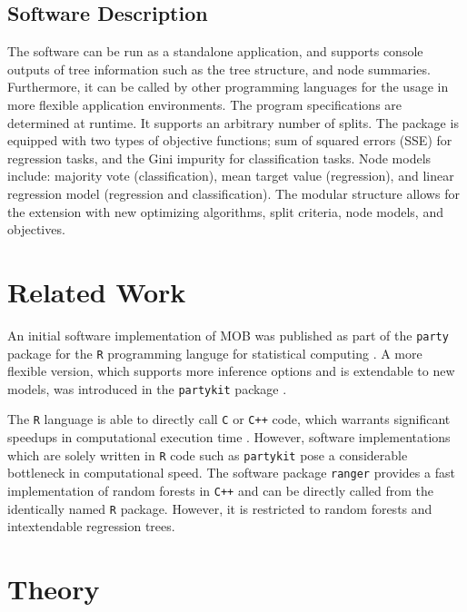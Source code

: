 \documentclass[a4paper, 11pt]{article}
\begin{document}
\subsection{Software Description}

The software can be run as a standalone application, and supports console outputs of tree information such as the tree structure, and node summaries. Furthermore, it can be called by other programming languages for the usage in more flexible application environments. The program specifications are determined at runtime. It supports an arbitrary number of splits.
The package is equipped with two types of objective functions; sum of squared errors (SSE) for regression tasks, and the Gini impurity for classification tasks. Node models include: majority vote (classification), mean target value (regression), and linear regression model (regression and classification).
The modular structure allows for the extension with 
new optimizing algorithms, split criteria, node models, and objectives. 

\section{Related Work}

An initial software implementation of MOB was published as part of the \texttt{party} package \cite{party_package} for the \texttt{R} programming languge for statistical computing \cite{r_citation}. A more flexible version, which supports more inference options and is extendable to new models, was introduced in the \texttt{partykit} package \cite{partykit_package}. 
\par
The \texttt{R} language is able to directly call \texttt{C} or \texttt{C++} code, which warrants significant speedups in computational execution time \cite{eddelbuettel_rcpp}. However, software implementations which are solely written in \texttt{R} code such as \texttt{partykit} pose a considerable bottleneck in computational speed.
The software package \texttt{ranger} \cite{ranger_package} provides a fast implementation of random forests in \texttt{C++} and can be directly called from the identically named \texttt{R} package. However, it is restricted to random forests and intextendable regression trees.

\section{Theory}
\end{document}
